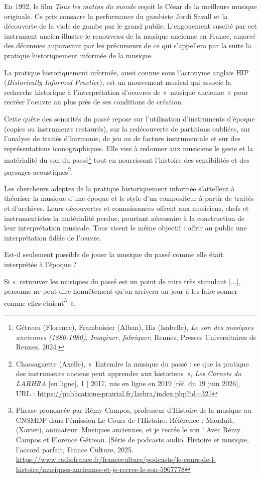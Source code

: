 \bigskip En 1992, le film \textit{Tous les matins du monde} reçoit le César de la meilleure musique originale. Ce prix consacre la performance du gambiste Jordi Savall et la découverte de la viole de gambe par le grand public. L’engouement suscité par cet instrument ancien illustre le renouveau de la musique ancienne en France, amorcé des décennies auparavant par les précurseurs de ce qui s'appellera par la suite la pratique historiquement informée de la musique.

\bigskip La pratique historiquement informée, aussi connue sous l’acronyme anglais HIP (\textit{Historically Informed Practice}), est un mouvement musical qui associe la recherche historique à l’interprétation d’oeuvres de «~musique ancienne~» pour recréer l’oeuvre au plus près de ses conditions de création.

\smallskip\indent Cette quête des sonorités du passé repose sur l’utilisation d’instruments d’époque (copies ou instruments restaurés), sur la redécouverte de partitions oubliées, sur l’analyse de traités d’harmonie, de jeu ou de facture instrumentale et sur des représentations iconographiques. Elle vise à redonner aux musiciens le geste et la matérialité du son du passé\footnote{Gétreau (Florence), Framboisier (Alban), His (Isabelle), \textit{Le son des musiques anciennes (1880-1980), Imaginer, fabriquer}, Rennes, Presses Universitaires de Rennes, 2024.} tout en nourrissant l’histoire des sensibilités et des paysages acoustiques\footnote{Chassagnette (Axelle), «~Entendre la musique du passé : ce que la pratique des instruments anciens peut apprendre aux historiens~», \textit{Les Carnets du LARHRA} [en ligne], 1 | 2017, mis en ligne en 2019 [réf. du 19 juin 2026], URL : \url{https://publications-prairial.fr/larhra/index.php?id=321}}.

\smallskip\indent Les chercheurs adeptes de la pratique historiquement informée s’attellent à théoriser la musique d’une époque et le style d’un compositeur à partir de traités et d’archives. Leurs découvertes et connaissances offrent aux musiciens, chefs et instrumentistes la matérialité perdue, pourtant nécessaire à la construction de leur interprétation musicale. Tous visent le même objectif : offrir au public une interprétation fidèle de l'œuvre.

\bigskip Est-il seulement possible de jouer la musique du passé comme elle était interprétée à l’époque ?

\smallskip\indent Si «~retrouver les musiques du passé est un point de mire très stimulant [...], personne ne peut dire honnêtement qu’on arrivera un jour à les faire sonner comme elles étaient\footnote{Phrase prononcée par Rémy Campos, professeur d'Histoire de la musique au CNSMDP dans l'émission Le Cours de l'Histoire. Référence : Mauduit, (Xavier), animateur. Musiques anciennes, et je recrée le son ! Avec Rémy Campos et Florence Gétreau. [Série de podcasts audio] Histoire et musique, l'accord parfait, France Culture, 2025. \url{https://www.radiofrance.fr/franceculture/podcasts/le-cours-de-l-histoire/musiques-anciennes-et-je-recree-le-son-5967778}}~». 

